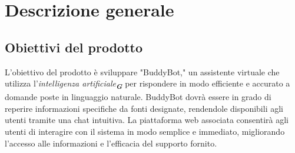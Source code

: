
\section{Descrizione generale}
\label{sec:descrizioneGenerale}

\subsection{Obiettivi del prodotto}
L'obiettivo del prodotto è sviluppare "BuddyBot," un assistente virtuale che utilizza l'\emph{intelligenza artificiale}\textsubscript{\textit{\textbf{G}}} 
per rispondere in modo efficiente e accurato a domande poste in linguaggio naturale. BuddyBot dovrà essere in grado 
di reperire informazioni specifiche da fonti designate, rendendole disponibili agli utenti tramite una chat intuitiva. 
La piattaforma web associata consentirà agli utenti di interagire con il sistema in modo semplice e immediato, migliorando
l'accesso alle informazioni e l'efficacia del supporto fornito.

